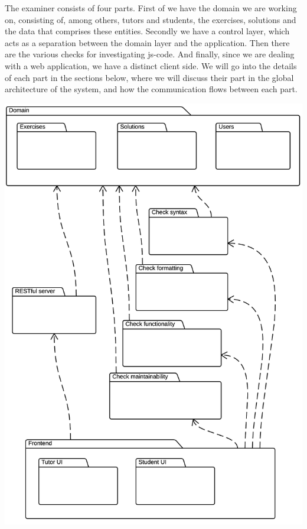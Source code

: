 %

The \gls{examiner} consists of four parts.
First of we have the domain we are working on, consisting of, among others,
tutors and students, the exercises, solutions
and the data that comprises these entities.
Secondly we have a control layer,
which acts as a separation between the domain layer and the application.
Then there are the various \glspl{check} for investigating \gls{js-code}.
And finally, since we are dealing with a web application,
we have a distinct client side.
We will go into the details of each part in the sections below,
where we will discuss their part in the global architecture of the system,
and how the communication flows between each part.

\includegraphics[scale=0.75]{diagrams-images/architecture}

